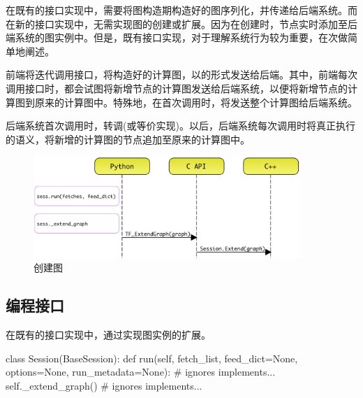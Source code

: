 \begin{content}

在既有的接口实现中，需要将图构造期构造好的图序列化，并传递给后端系统。而在新的接口实现中，无需实现图的创建或扩展。因为在创建时，节点实时添加至后端系统的图实例中。但是，既有接口实现，对于理解系统行为较为重要，在次做简单地阐述。

前端将迭代调用接口，将构造好的计算图，以的形式发送给\cpp{}后端。其中，前端每次调用接口时，都会试图将新增节点的计算图发送给后端系统，以便将新增节点的计算图到原来的计算图中。特殊地，在首次调用时，将发送整个计算图给后端系统。

后端系统首次调用时，转调(或等价实现)。以后，后端系统每次调用时将真正执行的语义，将新增的计算图的节点追加至原来的计算图中。

\begin{figure}[H]
\centering
\includegraphics[width=0.9\textwidth]{figures/py-session-create-graph.png}
\caption{创建图}
 \label{fig:py-session-create-graph}
\end{figure}

\subsection{编程接口}

在既有的接口实现中，通过实现图实例的扩展。

\begin{leftbar}
\begin{python}[caption={tensorflow/python/client/session.py}]
class Session(BaseSession):
  def run(self, fetch_list, feed_dict=None, options=None, run_metadata=None):
    # ignores implements...
    self._extend_graph()
    # ignores implements...

\end{python}
\end{leftbar}


\end{content}
